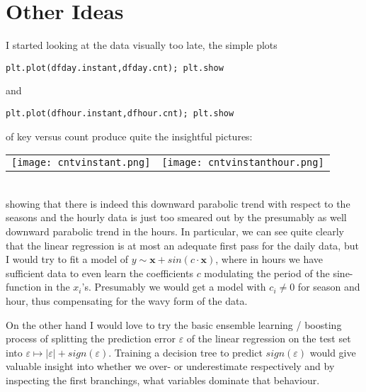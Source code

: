 \documentclass[11pt,oneside,a4paper]{scrartcl} %
\begin{document}
\section*{Other Ideas}
I started looking at the data visually too late, the simple plots 
\begin{verbatim}
plt.plot(dfday.instant,dfday.cnt); plt.show
\end{verbatim}
and
\begin{verbatim}
plt.plot(dfhour.instant,dfhour.cnt); plt.show
\end{verbatim}
of key versus count produce quite the insightful pictures:\\
\begin{tabular}{cc}
\begin{adjustbox}{width=0.5\textwidth}
\texttt{[image: cntvinstant.png]}
\end{adjustbox} & 
\begin{adjustbox}{width=0.5\textwidth}
\texttt{[image: cntvinstanthour.png]}
\end{adjustbox}
\end{tabular}\\
showing that there is indeed this downward parabolic trend with respect
to the seasons and the hourly data is just too smeared out by the presumably
as well downward parabolic trend in the hours. In particular, we can see quite
clearly that the linear regression is at most an adequate first pass for the
daily data, but I would try to fit a model of $y \sim \bm{x} + sin(c\cdot \bm{x})$, where
in hours we have sufficient data to even learn the coefficients $c$ modulating the
period of the sine-function in the $x_i$'s. Presumably we would get a model
with $c_i\neq 0$ for season and hour, thus compensating for the wavy form of the data.

On the other hand I would love to try the basic ensemble learning / boosting process
of splitting the prediction error $\varepsilon$ of the linear regression on the test set into
$\varepsilon \mapsto |\varepsilon| + sign(\varepsilon)$. Training a decision tree to predict
$sign(\varepsilon)$ would give valuable insight into whether we over- or 
underestimate respectively and by inspecting the first branchings, what variables 
dominate that behaviour. 
\end{document}
